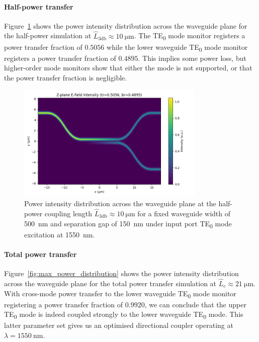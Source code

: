 \documentclass[10pt, a4paper]{article}
\begin{document}
\paragraph{Half-power transfer}
Figure~\ref{fig:eq_power_distribution} shows the power intensity distribution across the waveguide plane
for the half-power simulation at \(\hat{L}_{3\text{db}}\approx\SI{10}{\um}\).
The TE\textsubscript{0} mode monitor registers a power transfer fraction of
\(0.5056\) while the lower waveguide TE\textsubscript{0} mode monitor registers a power transfer fraction of
\(0.4895\). This implies some power loss, but higher-order mode monitors
show that either the mode is not supported, or that the power transfer fraction is negligible.

\begin{figure}[h!]
  \centering
  \includegraphics[width=0.8\textwidth]{task3/sim_1742_110625/z_plane_intensity.png}
  \caption{Power intensity distribution across the waveguide plane at the half-power coupling length \(\hat{L}_{3\text{db}}\approx\SI{10}{\um}\) for a fixed waveguide width of \SI{500}{\nm} and separation gap of \SI{150}{\nm} under input port TE\textsubscript{0} mode excitation at \SI{1550}{\nm}.}
  \label{fig:eq_power_distribution}
\end{figure}

\paragraph{Total power transfer}
Figure~\ref{fig:max_power_distribution} shows the power intensity distribution across the waveguide plane
for the total power transfer simulation at \(\hat{L}_c\approx\SI{21}{\um}\).
With cross-mode power transfer to the lower waveguide TE\textsubscript{0} mode monitor registering a power transfer fraction of
\(0.9920\), we can conclude that the upper TE\textsubscript{0} mode is indeed coupled strongly to the lower waveguide TE\textsubscript{0} mode.
This latter parameter set gives us an optimised directional coupler operating at \(\lambda=\SI{1550}{\nm}\).
\end{document}
